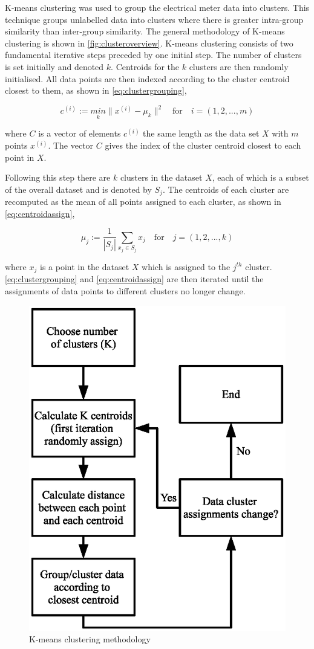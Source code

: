 K-means clustering was used to group the electrical meter data into clusters. This technique groups unlabelled data into clusters where there is greater intra-group similarity than inter-group similarity. The general methodology of K-means clustering is shown in \autoref{fig:clusteroverview}. K-means clustering consists of two fundamental iterative steps preceded by one initial step. The number of clusters is set initially and denoted $k$. Centroids for the $k$ clusters are then randomly initialised. All data points are then indexed according to the cluster centroid closest to them, as shown in \autoref{eq:clustergrouping},

\begin{equation}
c^{(i)}  := \underset{k}{min}  \lVert {x^{(i)} - \mu_k} \rVert ^2 \quad \text{for} \quad i = (1, 2, ..., m)
\label{eq:clustergrouping}
\end{equation}

where $C$ is a vector of elements $c^{(i)}$ the same length as the data set $X$ with $m$ points $x^{(i)}$. The vector $C$ gives the index of the cluster centroid closest to each point in $X$.

Following this step there are $k$ clusters in the dataset $X$, each of which is a subset of the overall dataset and is denoted by $S_j$. The centroids of each cluster are recomputed as the mean of all points assigned to each cluster, as shown in \autoref{eq:centroidassign},

\begin{equation}
\mu_j := \frac{1}{|S_j|}\sum_{x_j \in S_j} x_j \quad \text{for} \quad j = (1, 2, ..., k)
\label{eq:centroidassign}
\end{equation}

where $x_j$ is a point in the dataset $X$ which is assigned to the $j^{th}$ cluster. \autoref{eq:clustergrouping} and \autoref{eq:centroidassign} are then iterated until the assignments of data points to different clusters no longer change.

\begin{figure}
\includegraphics[width = .5\columnwidth]{./Images/ClusteringOverview.eps}
\caption{K-means clustering methodology}
\label{fig:clusteroverview}
\end{figure}

